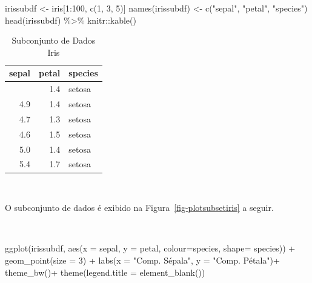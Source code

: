 \documentclass[
  a4paperpaper,
]{article}
\newenvironment{Shaded}{\begin{snugshade}}{\end{snugshade}}
\newcommand{\AttributeTok}[1]{\textcolor[rgb]{0.40,0.45,0.13}{#1}}
\newcommand{\DecValTok}[1]{\textcolor[rgb]{0.68,0.00,0.00}{#1}}
\newcommand{\FunctionTok}[1]{\textcolor[rgb]{0.28,0.35,0.67}{#1}}
\newcommand{\NormalTok}[1]{\textcolor[rgb]{0.00,0.23,0.31}{#1}}
\newcommand{\OtherTok}[1]{\textcolor[rgb]{0.00,0.23,0.31}{#1}}
\newcommand{\SpecialCharTok}[1]{\textcolor[rgb]{0.37,0.37,0.37}{#1}}
\newcommand{\StringTok}[1]{\textcolor[rgb]{0.13,0.47,0.30}{#1}}
\begin{document}
\begin{Shaded}
\begin{Highlighting}[]
\NormalTok{irissubdf }\OtherTok{\textless{}{-}}\NormalTok{ iris[}\DecValTok{1}\SpecialCharTok{:}\DecValTok{100}\NormalTok{, }\FunctionTok{c}\NormalTok{(}\DecValTok{1}\NormalTok{, }\DecValTok{3}\NormalTok{, }\DecValTok{5}\NormalTok{)]}
\FunctionTok{names}\NormalTok{(irissubdf) }\OtherTok{\textless{}{-}} \FunctionTok{c}\NormalTok{(}\StringTok{"sepal"}\NormalTok{, }\StringTok{"petal"}\NormalTok{, }\StringTok{"species"}\NormalTok{)}
\FunctionTok{head}\NormalTok{(irissubdf) }\SpecialCharTok{\%\textgreater{}\%}
\NormalTok{  knitr}\SpecialCharTok{::}\FunctionTok{kable}\NormalTok{()}
\end{Highlighting}
\end{Shaded}

\begin{longtable}[]{@{}rrl@{}}

\caption{\label{tbl-subsetiris}Subconjunto de Dados Iris}

\tabularnewline

\toprule\noalign{}
sepal & petal & species \\
\midrule\noalign{}
\endhead
\bottomrule\noalign{}
\endlastfoot
5.1 & 1.4 & setosa \\
4.9 & 1.4 & setosa \\
4.7 & 1.3 & setosa \\
4.6 & 1.5 & setosa \\
5.0 & 1.4 & setosa \\
5.4 & 1.7 & setosa \\

\end{longtable}

~

O subconjunto de dados é exibido na Figura~\ref{fig-plotsubsetiris} a
seguir.

~

\begin{Shaded}
\begin{Highlighting}[]
\FunctionTok{ggplot}\NormalTok{(irissubdf, }\FunctionTok{aes}\NormalTok{(}\AttributeTok{x =}\NormalTok{ sepal, }\AttributeTok{y =}\NormalTok{ petal,}
                      \AttributeTok{colour=}\NormalTok{species, }\AttributeTok{shape=}\NormalTok{ species)) }\SpecialCharTok{+} 
        \FunctionTok{geom\_point}\NormalTok{(}\AttributeTok{size =} \DecValTok{3}\NormalTok{) }\SpecialCharTok{+}
        \FunctionTok{labs}\NormalTok{(}\AttributeTok{x =} \StringTok{"Comp. Sépala"}\NormalTok{, }\AttributeTok{y =} \StringTok{"Comp. Pétala"}\NormalTok{)}\SpecialCharTok{+}
  \FunctionTok{theme\_bw}\NormalTok{()}\SpecialCharTok{+}
  \FunctionTok{theme}\NormalTok{(}\AttributeTok{legend.title =} \FunctionTok{element\_blank}\NormalTok{())}
\end{Highlighting}
\end{Shaded}
\end{document}
